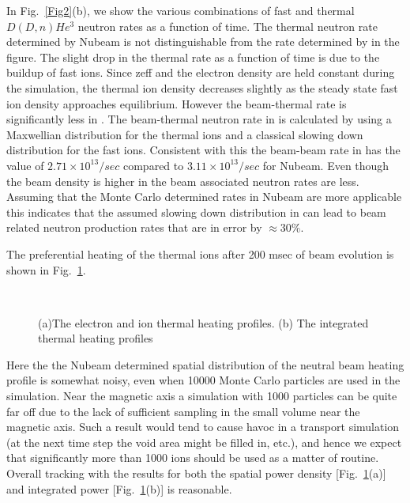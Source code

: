     In Fig.~\ref{Fig2}(b),  we show   the
    various combinations of fast and thermal $ D(D,n)He^3 $ neutron
    rates as a function of time. The thermal neutron rate determined
    by Nubeam is not distinguishable from  the rate determined by \ot
    in the figure. The
    slight drop in the thermal  rate as a function of time is due to the
    buildup of fast ions. Since zeff and the electron density are held
     constant during the simulation, the thermal ion density decreases
     slightly as the steady state fast ion density approaches equilibrium.
    However the beam-thermal rate is significantly less in \ot. The beam-thermal
    neutron rate in \ot is calculated by using a Maxwellian
    distribution
for the thermal ions and a classical slowing down distribution for the
fast ions. Consistent with this the beam-beam rate in \ot  has the
value of $2.71 \times 10^{13}/sec $ compared to $ 3.11 \times 10^{13}/sec$ for Nubeam.
    Even though the beam density is higher in \ot the beam associated
    neutron rates are less. Assuming that the Monte Carlo determined
    rates in Nubeam are more applicable this indicates that the assumed slowing
    down distribution in \ot can lead to beam related neutron
    production rates that are in error by $ \approx 30\%$.

   The preferential heating of the thermal ions after 200 msec of beam
   evolution is
   shown in Fig.~\ref{Fig3}. 
 \begin{figure} %
 \centering 
 \begin{narrow}{-.50in}{0in}   
   \mbox{
     }
   \mbox{  {}}
\end{narrow}
 \caption{(a)The electron and ion thermal heating profiles. (b) The integrated
   thermal heating profiles}
  \label{Fig3}
 \end{figure}   
   Here the the Nubeam determined spatial distribution of the
   neutral beam heating profile is somewhat noisy, even  when 10000
   Monte Carlo particles  are used in the simulation. Near the
   magnetic axis a simulation with 1000 particles can be quite far off due
   to the lack of sufficient sampling  in the small volume near the
   magnetic axis. Such a result would tend to cause havoc in a
   transport simulation (at the next time step the void area might be
   filled in, etc.), and hence we expect that significantly more than
   1000 ions should be used as a matter of routine. Overall tracking
   with the \ot results for both the spatial power density
   [Fig.~\ref{Fig3}(a)] and integrated power [Fig.~\ref{Fig3}(b)] is
   reasonable.


